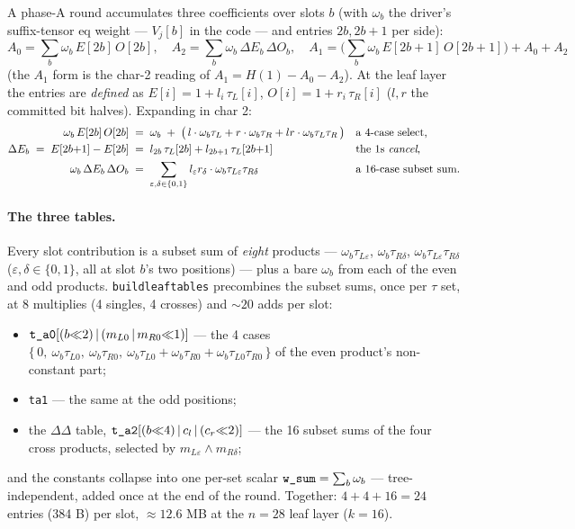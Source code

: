 \documentclass[11pt]{article}
\newcommand{\bits}{\{0,1\}}
\newcommand{\code}[1]{{\def\_{\textunderscore\allowbreak}\texttt{#1}}}
\theoremstyle{definition}
\begin{document}
A phase-A round accumulates three coefficients over slots $b$ (with
$\omega_b$ the driver's suffix-tensor eq weight --- $V_j[b]$ in the
code --- and entries $2b, 2b{+}1$ per side):
\[
  A_0 = \sum_b \omega_b\, E[2b]\,O[2b], \quad
  A_2 = \sum_b \omega_b\, \Delta E_b\, \Delta O_b, \quad
  A_1 = \Big(\sum_b \omega_b\, E[2b{+}1]\,O[2b{+}1]\Big) + A_0 + A_2
\]
(the $A_1$ form is the char-2 reading of $A_1 = H(1) - A_0 - A_2$).
At the leaf layer the entries are \emph{defined} as
$E[i] = 1 + l_i\,\tau_L[i]$, $O[i] = 1 + r_i\,\tau_R[i]$ ($l, r$ the
committed bit halves).  Expanding in char 2:
\begin{align*}
  \omega_b\,E[2b]\,O[2b]
  &\;=\; \omega_b \;+\;
     \big(\, l\cdot\omega_b\tau_L + r\cdot\omega_b\tau_R
        + lr\cdot\omega_b\tau_L\tau_R \,\big)
   && \text{a 4-case select,} \\
  \Delta E_b \;=\; E[2b{+}1] - E[2b]
  &\;=\; l_{2b}\,\tau_L[2b] + l_{2b+1}\,\tau_L[2b{+}1]
   && \text{the } 1\text{s \emph{cancel},} \\
  \omega_b\,\Delta E_b\,\Delta O_b
  &\;=\; \sum_{\varepsilon,\delta \in \bits}
     l_\varepsilon r_\delta\cdot
     \omega_b \tau_{L\varepsilon}\tau_{R\delta}
   && \text{a 16-case subset sum.}
\end{align*}
\paragraph{The three tables.}
Every slot contribution is a subset sum of \emph{eight} products ---
$\omega_b\tau_{L\varepsilon}$, $\omega_b\tau_{R\delta}$,
$\omega_b\tau_{L\varepsilon}\tau_{R\delta}$
($\varepsilon, \delta \in \bits$, all at slot $b$'s two positions) ---
plus a bare $\omega_b$ from each of the even and odd products.
\code{build\_leaf\_tables} precombines the subset sums, once per $\tau$
set, at 8 multiplies (4 singles, 4 crosses) and ${\sim}20$ adds per
slot:
\begin{itemize}[itemsep=2pt]
\item $\code{t\_a0}[(b{\ll}2) \,|\, (m_{L0} \,|\, m_{R0}{\ll}1)]$ ---
  the 4 cases
  $\{\,0,\ \omega_b\tau_{L0},\ \omega_b\tau_{R0},\
  \omega_b\tau_{L0} + \omega_b\tau_{R0} +
  \omega_b\tau_{L0}\tau_{R0}\,\}$
  of the even product's non-constant part;
\item \code{t\_a1} --- the same at the odd positions;
\item the $\Delta\Delta$ table,
  $\code{t\_a2}[(b{\ll}4) \,|\, c_l \,|\, (c_r{\ll}2)]$ --- the 16
  subset sums of the four cross products, selected by
  $m_{L\varepsilon} \wedge m_{R\delta}$;
\end{itemize}
and the constants collapse into one per-set scalar
$\code{w\_sum} = \sum_b \omega_b$ --- tree-independent, added once at
the end of the round.  Together: $4 + 4 + 16 = 24$ entries (384 B) per
slot, ${\approx}12.6$ MB at the $n = 28$ leaf layer ($k = 16$).
\end{document}

